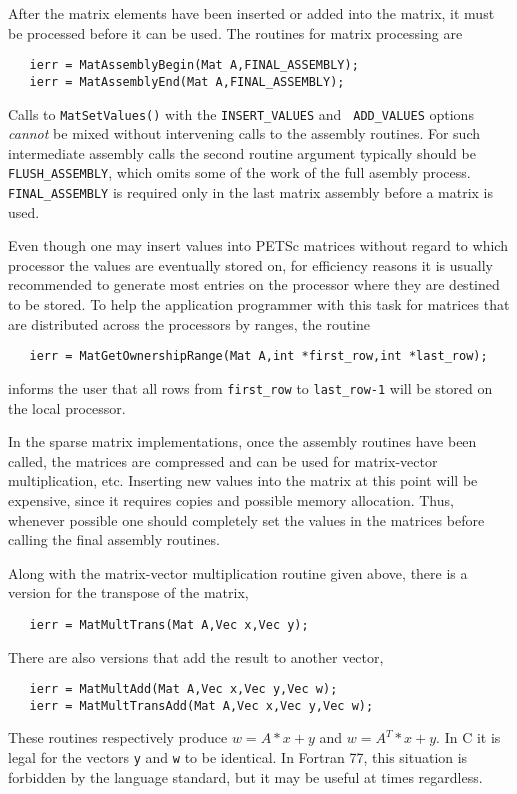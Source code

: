 After the matrix elements have been inserted or added into the matrix, 
it must be processed before it can be used. The routines for matrix
processing are  
\begin{verbatim}
   ierr = MatAssemblyBegin(Mat A,FINAL_ASSEMBLY);
   ierr = MatAssemblyEnd(Mat A,FINAL_ASSEMBLY);
\end{verbatim}
Calls to {\tt MatSetValues()} with the {\tt INSERT\_VALUES} and {\tt
ADD\_VALUES} options {\em cannot} be mixed without intervening calls to
the assembly routines.  For such intermediate assembly calls the
second routine argument  typically should be {\tt FLUSH\_ASSEMBLY},
 which omits some of the work of the full 
asembly process.  {\tt FINAL\_ASSEMBLY}  is
required only in the last matrix assembly before a matrix is used.

Even though one may insert values into PETSc matrices without regard
to which processor the values are eventually stored on, for efficiency
reasons it is usually recommended to generate most entries on the
processor where they are destined to be stored.  To help the
application programmer with this task for matrices that are
distributed across the processors by ranges, the routine
\begin{verbatim}
   ierr = MatGetOwnershipRange(Mat A,int *first_row,int *last_row);
\end{verbatim}
informs the user that all rows from {\tt first\_row} to 
{\tt last\_row-1} will be stored on the local processor.

In the sparse matrix implementations, once the assembly routines have been 
called, the matrices are compressed and can be used for matrix-vector
multiplication, etc.
Inserting new values into the matrix at this point will be expensive, 
since it requires copies and possible memory allocation. Thus, whenever 
possible one should completely set the values in the matrices before 
calling the final assembly routines. 

Along with the matrix-vector multiplication routine given above, there is 
a version for the transpose of the matrix, 
\begin{verbatim}
   ierr = MatMultTrans(Mat A,Vec x,Vec y);
\end{verbatim}
There are also versions that add the result
to another vector,  
\begin{verbatim}
   ierr = MatMultAdd(Mat A,Vec x,Vec y,Vec w);
   ierr = MatMultTransAdd(Mat A,Vec x,Vec y,Vec w);
\end{verbatim}
These routines respectively produce $w = A*x + y$ and $w = A^{T}*x + y$. 
In C it is legal for the vectors {\tt y} and {\tt w} to be identical.
In Fortran 77, this situation is forbidden by the language standard, 
but it may be useful at times regardless.

